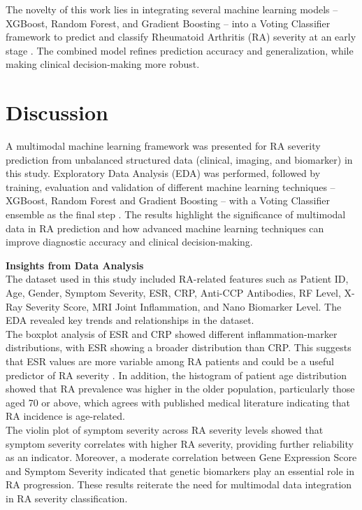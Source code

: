 \documentclass[10pt]{NSP1}
\begin{document}
	\noindent The novelty of this work lies in integrating several machine learning models -- XGBoost, Random Forest, and Gradient Boosting -- into a Voting Classifier framework to predict and classify Rheumatoid Arthritis (RA) severity at an early stage \cite{tan2022multi}. The combined model refines prediction accuracy and generalization, while making clinical decision-making more robust.
	
	\section{Discussion}
	A multimodal machine learning framework was presented for RA severity prediction from unbalanced structured data (clinical, imaging, and biomarker) in this study. Exploratory Data Analysis (EDA) was performed, followed by training, evaluation and validation of different machine learning techniques -- XGBoost, Random Forest and Gradient Boosting -- with a Voting Classifier ensemble as the final step \cite{wang2025missing}. The results highlight the significance of multimodal data in RA prediction and how advanced machine learning techniques can improve diagnostic accuracy and clinical decision-making.
	
	\textbf{Insights from Data Analysis}\\
	The dataset used in this study included RA-related features such as Patient ID, Age, Gender, Symptom Severity, ESR, CRP, Anti-CCP Antibodies, RF Level, X-Ray Severity Score, MRI Joint Inflammation, and Nano Biomarker Level. The EDA revealed key trends and relationships in the dataset.\\
	The boxplot analysis of ESR and CRP showed different inflammation-marker distributions, with ESR showing a broader distribution than CRP. This suggests that ESR values are more variable among RA patients and could be a useful predictor of RA severity \cite{cai2025mm}. In addition, the histogram of patient age distribution showed that RA prevalence was higher in the older population, particularly those aged 70 or above, which agrees with published medical literature indicating that RA incidence is age-related.\\
	The violin plot of symptom severity across RA severity levels showed that symptom severity correlates with higher RA severity, providing further reliability as an indicator. Moreover, a moderate correlation between Gene Expression Score and Symptom Severity indicated that genetic biomarkers play an essential role in RA progression. These results reiterate the need for multimodal data integration in RA severity classification.
	
\end{document}
